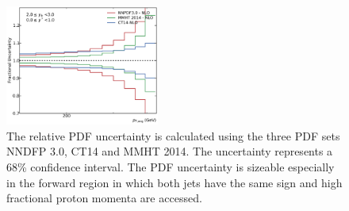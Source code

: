 \begin{figure}[htp]
    \includegraphics[width=0.45\textwidth]{figures/theory/pdf_unc_comparison_yb2ys0.pdf}
    \caption[PDF uncertainty]{The relative PDF uncertainty is calculated using the three PDF sets
    NNDFP 3.0, CT14 and MMHT 2014. The uncertainty represents a 68\% confidence
    interval. The PDF uncertainty is sizeable especially in the forward region in
    which both jets have the same sign and high fractional proton momenta are
    accessed. }
    \label{fig:pdf_uncertainties}
\end{figure}

